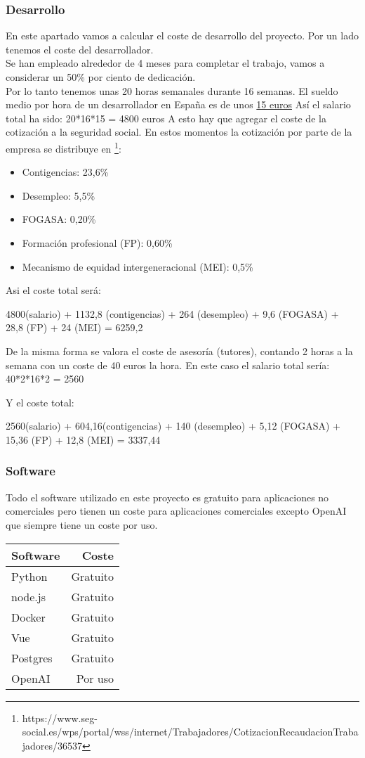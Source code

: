 \subsubsection{Desarrollo}
En este apartado vamos a calcular el coste de desarrollo del proyecto.
Por un lado tenemos el coste del desarrollador.\\
Se han empleado alrededor de 4 meses para completar el trabajo, vamos a considerar 
un 50\% por ciento de dedicación.\\
Por lo tanto tenemos unas 20 horas semanales durante 16 semanas.
El sueldo medio por hora de un desarrollador en España es de unos \href{https://es.talent.com}{15 euros} 
Así el salario total ha sido: 20*16*15 = 4800 euros
A esto hay que agregar el coste de la cotización a la seguridad social.
En estos momentos la cotización por parte de la empresa se distribuye en 
\footnote{https://www.seg-social.es/wps/portal/wss/internet/Trabajadores/CotizacionRecaudacionTrabajadores/36537}:
\begin{itemize}
    \item Contigencias: 23,6\%
    \item Desempleo: 5,5\%
    \item FOGASA: 0,20\%
    \item Formación profesional (FP): 0,60\%
    \item Mecanismo de equidad intergeneracional (MEI): 0,5\%
\end{itemize}
Asi el coste total será:

4800(salario) + 1132,8 (contigencias) + 264 (desempleo) + 9,6 (FOGASA) + 28,8 (FP) + 24 (MEI) = 6259,2

De la misma forma se valora el coste de asesoría (tutores), contando 2 horas a la
 semana con un coste de 40 euros la hora. 
En este caso el salario total sería:
40*2*16*2 = 2560

Y el coste total: 

2560(salario) + 604,16(contigencias) +  140 (desempleo) + 5,12 (FOGASA) + 15,36 (FP) + 12,8 (MEI) = 3337,44

\subsubsection{Software}
Todo el software utilizado en este proyecto es gratuito para aplicaciones no comerciales pero tienen un 
coste para aplicaciones comerciales excepto OpenAI que siempre tiene un coste por uso.

\begin{tabular}{l r}
    \hline
    \textbf{Software} & \textbf{Coste}\\ \hline
    Python & Gratuito \\ \hline
    node.js & Gratuito\\ \hline
    Docker & Gratuito\\ \hline
    Vue & Gratuito\\ \hline
    Postgres & Gratuito\\ \hline
    OpenAI & Por uso\\ \hline
\end{tabular}


